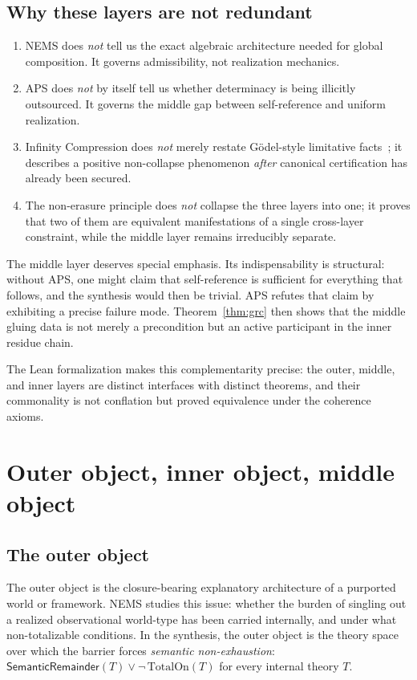 \documentclass[11pt]{article}
\newcommand{\SemRem}{\ensuremath{\mathsf{SemanticRemainder}}}
\begin{document}
\subsection{Why these layers are not redundant}

\begin{enumerate}[leftmargin=2em]
\item NEMS does \emph{not} tell us the exact algebraic architecture needed for global
composition.  It governs admissibility, not realization mechanics.
\item APS does \emph{not} by itself tell us whether determinacy is being illicitly
outsourced.  It governs the middle gap between self-reference and uniform realization.
\item Infinity Compression does \emph{not} merely restate Gödel-style limitative
facts~\cite{Godel1931}; it describes a positive non-collapse phenomenon \emph{after}
canonical certification has already been secured.
\item The non-erasure principle does \emph{not} collapse the three layers into one; it
proves that two of them are equivalent manifestations of a single cross-layer constraint,
while the middle layer remains irreducibly separate.
\end{enumerate}

The middle layer deserves special emphasis.  Its indispensability is structural: without
APS, one might claim that self-reference is sufficient for everything that follows, and
the synthesis would then be trivial.  APS refutes that claim by exhibiting a precise
failure mode.  Theorem~\ref{thm:grc} then shows that the middle gluing data is not
merely a precondition but an active participant in the inner residue chain.

The Lean formalization makes this complementarity precise: the outer, middle, and inner
layers are distinct interfaces with distinct theorems, and their commonality is not
conflation but proved equivalence under the coherence axioms.

\section{Outer object, inner object, middle object}
\label{sec:objects}

\subsection{The outer object}

The outer object is the closure-bearing explanatory architecture of a purported world
or framework.  NEMS studies this issue: whether the burden of singling out a realized
observational world-type has been carried internally, and under what non-totalizable
conditions.  In the synthesis, the outer object is the theory space over which the
barrier forces \emph{semantic non-exhaustion}: $\SemRem(T) \lor \neg\,\mathrm{TotalOn}(T)$
for every internal theory $T$.
\end{document}
